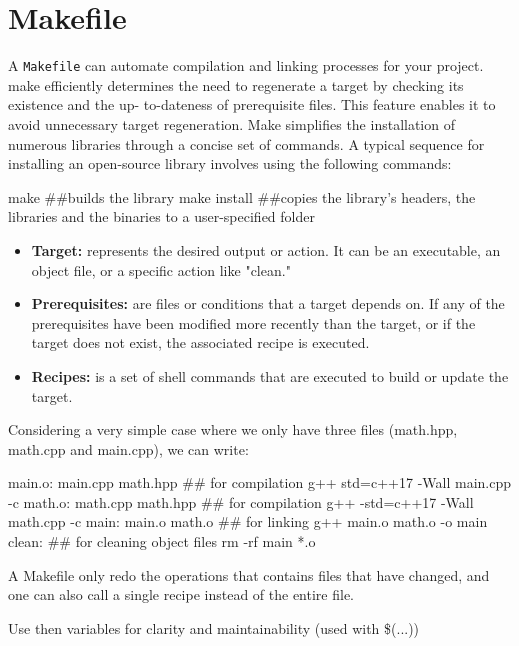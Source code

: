 \newpage
\section{Makefile}


A \texttt{Makefile} can automate compilation and linking processes for your project. make efficiently determines the need to regenerate a target by checking its existence and the up-
to-dateness of prerequisite files. This feature enables it to avoid unnecessary target regeneration.
Make simplifies the installation of numerous libraries through a concise set of commands. A typical
sequence for installing an open-source library involves using the following commands:

\begin{codeblock}[language=bash]
    make  ##builds the library
    make install   ##copies the library's headers, the libraries and the binaries to a user-specified folder
\end{codeblock}

\begin{itemize}
    \item \textbf{Target:} represents the desired output or action. It can be an executable, an
object file, or a specific action like "clean."
    \item \textbf{Prerequisites:} are files or conditions that a target depends on. If any of the prerequisites have
been modified more recently than the target, or if the target does not exist, the associated
recipe is executed.
    \item \textbf{Recipes:} is a set of shell commands that are executed to build or update the target.
\end{itemize}

Considering a very simple case where we only have three files (math.hpp, math.cpp and main.cpp), we can write:

\begin{codeblock}[language=bash]
main.o: main.cpp math.hpp   ## for compilation
    g++ std=c++17 -Wall main.cpp -c
math.o: math.cpp math.hpp   ## for compilation
    g++ -std=c++17 -Wall math.cpp -c
main: main.o math.o   ## for linking
    g++ main.o math.o -o main
clean:   ## for cleaning object files
    rm -rf main *.o
\end{codeblock}

A Makefile only redo the operations that contains files that have changed, and one can also call a single recipe instead of the entire file.


Use then variables for clarity and maintainability (used with \$(...))

